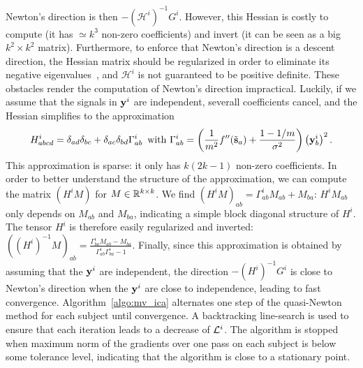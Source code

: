 \documentclass[12pt]{report}
\begin{document}
Newton's direction is then $-\left(\mathcal{H}^i\right)^{-1}G^i$. However, this Hessian is costly to compute (it has $\simeq k^3$ non-zero coefficients) and invert (it can be seen as a big $k ^2\times k^2$ matrix). Furthermore, to enforce that Newton's direction is a descent direction, the Hessian matrix should be regularized in order to eliminate its negative eigenvalues~\cite{nocedal2006numerical}, and $\mathcal{H}^i$ is not guaranteed to be positive definite.
%
These obstacles render the computation of Newton's direction impractical.
%
Luckily, if we assume that the signals in $\mathbf{y}^i$ are independent, severall coefficients cancel, and the Hessian simplifies to the approximation
\begin{equation}
    \label{eq:hessian_approx}
    H^i_{abcd} = \delta_{ad}\delta_{bc} + \delta_{ac}\delta_{bd}\Gamma^i_{ab}\enspace \text{with  }\Gamma^i_{ab} = \left(\frac{1}{m^2}f''(\tilde{\mathbf{s}}_a) + \frac{1 - 1/m}{\sigma^2}\right)\left(\mathbf{y}^i_{b}\right)^2.
\end{equation}
This approximation is sparse: it only has $k(2k -1)$ non-zero coefficients.
%
In order to better understand the structure of the approximation, we can compute the matrix $\left(H^iM\right)$ for $M\in \mathbb{R}^{k\times k}$. 
%
We find $\left(H^iM\right)_{ab} = \Gamma^i_{ab}M_{ab} + M_{ba}$: $H^iM_{ab}$ only depends on $M_{ab}$ and $M_{ba}$, indicating a simple block diagonal structure of $H^i$.
%
The tensor $H^i$ is therefore easily regularized and inverted:
$\left((H^i)^{-1}M\right)_{ab} = \frac{\Gamma^i_{ba}M_{ab} - M_{ba}}{\Gamma^i_{ab}\Gamma^i_{ba} - 1}$.
%
Finally, since this approximation is obtained by assuming that the $\mathbf{y}^i$ are independent, the direction $-\left(H^i\right)^{-1}G^i$ is close to Newton's direction when the $\mathbf{y}^i$ are close to independence, leading to fast convergence.
%
Algorithm~\ref{algo:mv_ica} alternates one step of the quasi-Newton method for each subject until convergence.
%
A backtracking line-search is used to ensure that each iteration leads to a decrease of $\mathcal{L}^i$.
%
The algorithm is stopped when maximum norm of the gradients over one pass on each subject is below some tolerance level, indicating that the algorithm is close to a stationary point.
\end{document}
